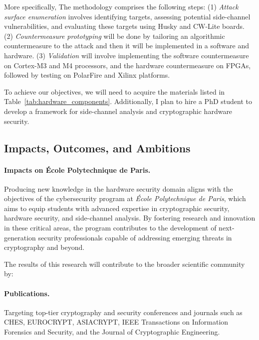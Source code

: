 \documentclass[11pt, a4paper]{article}
\begin{document}
More specifically, The methodology comprises the following steps:
(1) \textit{Attack surface enumeration} involves identifying targets, assessing potential 
side-channel vulnerabilities, and evaluating these targets 
using Husky and CW-Lite boards.
(2) \textit{Countermeasure prototyping} will be done by tailoring an algorithmic countermeasure to the 
attack and then it will be implemented in a software and hardware. 
(3) \textit{Validation} will involve implementing the software countermeasure on 
Cortex-M3 and M4 processors, and the hardware countermeasure on FPGAs, 
followed by testing on PolarFire and Xilinx platforms.

To achieve our objectives, we will need to acquire the materials 
listed in Table~\ref{tab:hardware_components}. Additionally, I 
plan to hire a PhD student to develop a framework for side-channel 
analysis and cryptographic hardware security.

\subsection*{Impacts, Outcomes, and Ambitions}

\paragraph{Impacts on \'Ecole Polytechnique de Paris.} 
Producing new knowledge in the hardware security domain aligns with the objectives of the cybersecurity 
program at \emph{École Polytechnique de Paris}, which aims to equip students with advanced 
expertise in cryptographic security, hardware security, and side-channel analysis. By fostering 
research and innovation in these critical areas, the program contributes to the development of 
next-generation security professionals capable of addressing emerging threats in cryptography 
and beyond.

The results of this research will contribute to the broader scientific community by:

\paragraph{Publications.} Targeting top-tier cryptography and security conferences and journals such as 
CHES, EUROCRYPT, ASIACRYPT, IEEE Transactions on Information Forensics and Security, and the 
Journal of Cryptographic Engineering.
\end{document}

